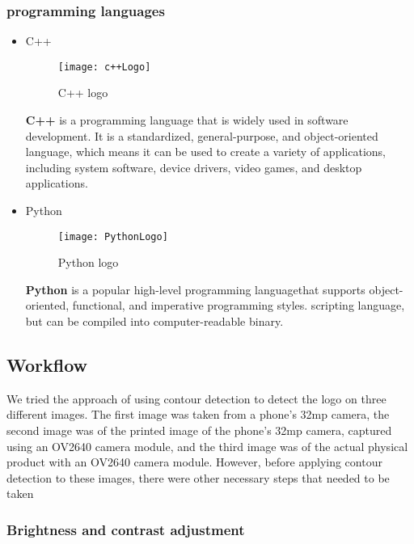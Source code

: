 \subsubsection{programming languages}
\begin{itemize}

\item C++
\FloatBarrier
\begin{figure}[h]
         \centering
        \texttt{[image: c++Logo]}
   
        \caption{C++ logo}
        \label{fig:c++Logo}
    \end{figure}
\FloatBarrier
\subitem\textbf{C++} is a programming language that is widely used in software development. It is a standardized, general-purpose, and object-oriented language, which means it can be used to create a variety of applications, including system software, device drivers, video games, and desktop applications.\cite{SD20}

\item Python
\begin{figure}[h]
\FloatBarrier
         \centering
        \texttt{[image: PythonLogo]}
   
        \caption{Python logo}
        \label{fig:PythonLogo}
\FloatBarrier
    \end{figure}
\subitem\textbf{Python} is a popular high-level programming languagethat supports object-oriented, functional, 
and imperative programming styles. scripting language, but can be compiled into computer-readable binary.\cite{SD20}


\end{itemize}

\subsection{Workflow}
We tried the approach of using contour detection to detect the logo on three different images. The first image was taken from a phone's 32mp camera, the second image was of the printed image of the phone's 32mp camera, captured using an OV2640 camera module, and the third image was of the actual physical product with an OV2640 camera module. However, before applying contour detection to these images, there were other necessary steps that needed to be taken
\subsubsection{Brightness and contrast adjustment}

